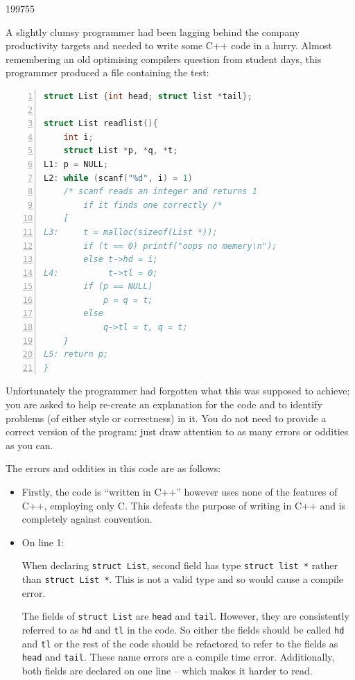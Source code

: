 \documentclass[10pt,\jkfside,a4paper]{article}
\begin{document}
\begin{examquestion}{1997}{5}{5}

A slightly clumsy programmer had been lagging behind the company
productivity targets and needed to write some C++ code in a hurry. Almost
remembering an old optimising compilers question from student days, this
programmer produced a file containing the test:

\begin{lstlisting}[language=C, numbers=left]
struct List {int head; struct list *tail};

struct List readlist(){
	int i;
	struct List *p, *q, *t;
L1:	p = NULL;
L2:	while (scanf("%d", i) = 1)
	/* scanf reads an integer and returns 1
		if it finds one correctly /*
	[
L3:		t = malloc(sizeof(List *));
		if (t == 0) printf("oops no memery\n");
		else t->hd = i;
L4:			 t->tl = 0;
		if (p == NULL)
			p = q = t;
		else
			q->tl = t, q = t;
	}
L5:	return p;
}

\end{lstlisting}

Unfortunately the programmer had forgotten what this was supposed to
achieve; you are asked to help re-create an explanation for the code and to
identify problems (of either style or correctness) in it. You do not need to
provide a correct version of the program: just draw attention to as many
errors or oddities as you can.

The errors and oddities in this code are as follows:

\begin{itemize}

\item Firstly, the code is ``written in C++'' however uses none of the
features of C++, employing only C. This defeats the purpose of writing in
C++ and is completely against convention.

\item On line 1:

When declaring \texttt{struct List}, second field has type \texttt{struct list
*} rather than \texttt{struct List *}. This is not a valid type and so would
cause a compile error.

The fields of \texttt{struct List} are \texttt{head} and \texttt{tail}.
However, they are consistently referred to as \texttt{hd} and \texttt{tl} in
the code. So either the fields should be called \texttt{hd} and \texttt{tl}
or the rest of the code should be refactored to refer to the fields as
\texttt{head} and \texttt{tail}. These name errors are a compile time error.
Additionally, both fields are declared on one line -- which makes it harder
to read.


\end{itemize}
\end{examquestion}
\end{document}
